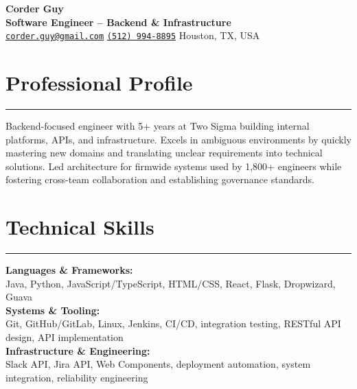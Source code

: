 \documentclass[10pt]{article}
\begin{document}
\begin{center}
  {\Huge\textbf{Corder Guy}} \\
  \vspace{0.7em}
  {\Large\textbf{Software Engineer -- Backend \& Infrastructure}} \\
  \href{mailto:corder.guy@gmail.com}{\texttt{corder.guy@gmail.com}}
  \textbar{}
  \href{tel:+15129948895}{\texttt{(512) 994-8895}}
  \textbar{}
  Houston, TX, USA
\end{center}

\newcommand{\sectionline}{\vspace{-0.75em}\hrule\vspace{0.5em}}
\newcommand{\resumesection}[1]{\section*{{\fontsize{17}{19}\selectfont #1}} \sectionline}

\resumesection{Professional Profile}
Backend-focused engineer with 5+ years at Two Sigma building internal platforms, APIs, and infrastructure. Excels in ambiguous environments by quickly mastering new domains and translating unclear requirements into technical solutions. Led architecture for firmwide systems used by 1,800+ engineers while fostering cross-team collaboration and establishing governance standards.

\newcommand{\skillsection}[2]{\textbf{#1:} \\ \hspace*{1em} #2}

\resumesection{Technical Skills}
\skillsection{Languages \& Frameworks}{}
Java, Python, JavaScript/TypeScript, HTML/CSS, React, Flask, Dropwizard, Guava \\
\skillsection{Systems \& Tooling}{}
Git, GitHub/GitLab, Linux, Jenkins, CI/CD, integration testing, RESTful API design, API implementation \\
\skillsection {Infrastructure \& Engineering}{}
Slack API, Jira API, Web Components, deployment automation, system integration, reliability engineering


\newcommand{\sectionentry}[2]{\textbf{#1} \hfill \emph{#2}}

\newcommand{\roleentry}[1]{\textbf{#1}}

\newenvironment{role}[1]{
  \roleentry{#1}
  \begin{itemize}[left=1.5em]
}{
  \end{itemize}
}
\end{document}
